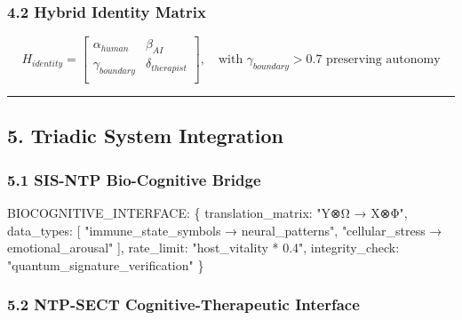 \documentclass[
]{article}
\newenvironment{Shaded}{}{}
\newcommand{\NormalTok}[1]{#1}
\begin{document}
\subsubsection{\texorpdfstring{\textbf{4.2 Hybrid Identity
Matrix}}{4.2 Hybrid Identity Matrix}}\label{hybrid-identity-matrix}

\[
H_{identity} = \begin{bmatrix}
\alpha_{human} & \beta_{AI} \\
\gamma_{boundary} & \delta_{therapist} \\
\end{bmatrix}, \quad \text{with } \gamma_{boundary} > 0.7 \text{ preserving autonomy}
\]

\begin{center}\rule{0.5\linewidth}{0.5pt}\end{center}

\subsection{\texorpdfstring{\textbf{5. Triadic System
Integration}}{5. Triadic System Integration}}\label{triadic-system-integration}

\subsubsection{\texorpdfstring{\textbf{5.1 SIS-NTP Bio-Cognitive
Bridge}}{5.1 SIS-NTP Bio-Cognitive Bridge}}\label{sis-ntp-bio-cognitive-bridge}

\begin{Shaded}
\begin{Highlighting}[]
\NormalTok{BIOCOGNITIVE\_INTERFACE: \{}
\NormalTok{  translation\_matrix: "Y⊗Ω → X⊗Φ",}
\NormalTok{  data\_types: [}
\NormalTok{    "immune\_state\_symbols → neural\_patterns",}
\NormalTok{    "cellular\_stress → emotional\_arousal"}
\NormalTok{  ],}
\NormalTok{  rate\_limit: "host\_vitality * 0.4",}
\NormalTok{  integrity\_check: "quantum\_signature\_verification"}
\NormalTok{\}}
\end{Highlighting}
\end{Shaded}

\subsubsection{\texorpdfstring{\textbf{5.2 NTP-SECT
Cognitive-Therapeutic
Interface}}{5.2 NTP-SECT Cognitive-Therapeutic Interface}}\label{ntp-sect-cognitive-therapeutic-interface}
\end{document}
